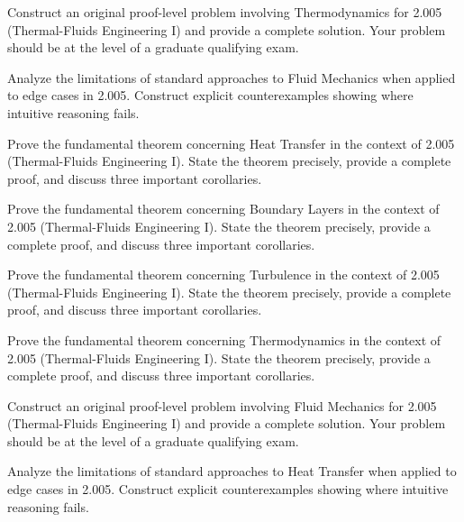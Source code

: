 \documentclass[12pt,a4paper]{exam}
\begin{document}
\begin{questions}

\question[3]
Construct an original proof-level problem involving Thermodynamics for 2.005 (Thermal-Fluids Engineering I) and provide a complete solution. Your problem should be at the level of a graduate qualifying exam.

\vspace{0.3cm}

\question[4]
Analyze the limitations of standard approaches to Fluid Mechanics when applied to edge cases in 2.005. Construct explicit counterexamples showing where intuitive reasoning fails.

\vspace{0.3cm}

\question[4]
Prove the fundamental theorem concerning Heat Transfer in the context of 2.005 (Thermal-Fluids Engineering I). State the theorem precisely, provide a complete proof, and discuss three important corollaries.

\vspace{0.3cm}

\question[5]
Prove the fundamental theorem concerning Boundary Layers in the context of 2.005 (Thermal-Fluids Engineering I). State the theorem precisely, provide a complete proof, and discuss three important corollaries.

\vspace{0.3cm}

\question[5]
Prove the fundamental theorem concerning Turbulence in the context of 2.005 (Thermal-Fluids Engineering I). State the theorem precisely, provide a complete proof, and discuss three important corollaries.

\vspace{0.3cm}

\question[2]
Prove the fundamental theorem concerning Thermodynamics in the context of 2.005 (Thermal-Fluids Engineering I). State the theorem precisely, provide a complete proof, and discuss three important corollaries.

\vspace{0.3cm}

\question[4]
Construct an original proof-level problem involving Fluid Mechanics for 2.005 (Thermal-Fluids Engineering I) and provide a complete solution. Your problem should be at the level of a graduate qualifying exam.

\vspace{0.3cm}

\question[6]
Analyze the limitations of standard approaches to Heat Transfer when applied to edge cases in 2.005. Construct explicit counterexamples showing where intuitive reasoning fails.


\end{questions}
\end{document}
